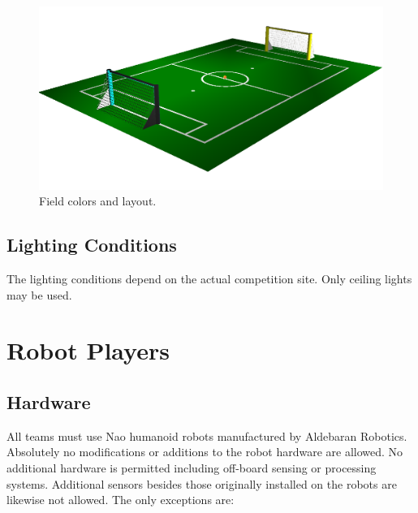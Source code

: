 \documentclass[12pt]{article}
\begin{document}
\begin{figure}[t]
\centerline{\includegraphics[width=\columnwidth]{figs/Nao2009Field-View.png}}
\caption{Field colors and layout.}
\label{fig:field_color}
\end{figure}

\subsection{Lighting Conditions}

The lighting conditions depend on the actual competition site. Only ceiling lights may be used. 

\section{Robot Players}

\subsection{Hardware}

All teams must use Nao humanoid robots manufactured by Aldebaran Robotics. Absolutely no modifications or additions to the robot hardware are allowed. No additional hardware is permitted including off-board sensing or processing systems. Additional sensors besides those originally installed on the robots are likewise not allowed. The only exceptions are:
\end{document}
